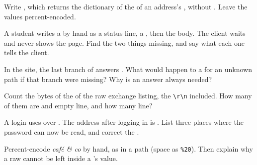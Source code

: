 \begin{exercise}[$\star$]\label{exo:g10:http-clients-servers:5}
Write , which returns the dictionary of the  of an address's , without
. Leave the values percent-encoded.
\end{exercise}

\begin{exercise}[$\star\star$]\label{exo:g10:http-clients-servers:6}
A student writes a  by hand as a status line, a  , then the body. The client waits
and never shows the page. Find the two things missing, and say what each one tells the client.
\end{exercise}

\begin{exercise}[$\star\star$]\label{exo:g10:http-clients-servers:7}
In the site, the last branch of  answers . What would happen to a  for an unknown path
if that branch were missing? Why is an answer always needed?
\end{exercise}

\begin{exercise}[$\star\star$]\label{exo:g10:http-clients-servers:8}
Count the bytes of the  of the raw exchange listing, the \texttt{\textbackslash r\textbackslash n} included. How many of them are
 and empty line, and how many  line?
\end{exercise}

\begin{exercise}[$\star\star$]\label{exo:g10:http-clients-servers:9}
A login  uses  over . The address after logging in is
. List three places where the password can now be read, and correct the
.
\end{exercise}

\begin{exercise}[$\star\star$]\label{exo:g10:http-clients-servers:10}
Percent-encode \textit{café \& co} by hand, as in a path (space as \texttt{\%20}). Then explain why a raw \code{&}
cannot be left inside a 's value.
\end{exercise}

